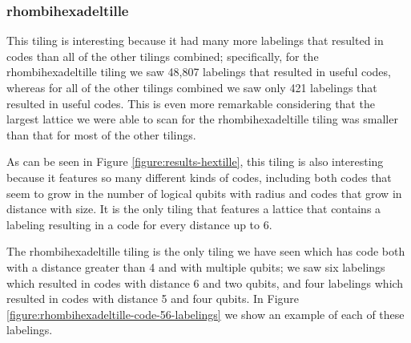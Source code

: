\documentclass[twocolumn,showpacs,preprintnumbers,amsmath,amssymb,nofootinbib,pra,floatfix]{revtex4-1}
\begin{document}
\subsubsection{rhombihexadeltille}

This tiling is interesting because it had many more labelings that resulted in codes  than all of the other tilings combined;  specifically, for the rhombihexadeltille tiling we saw 48,807 labelings that resulted in useful codes, whereas for all of the other tilings combined we saw only 421 labelings that resulted in useful codes.  This is even more remarkable considering that the largest lattice we were able to scan for the rhombihexadeltille tiling was smaller than that for most of the other tilings.

As can be seen in Figure \ref{figure:results-hextille}, this tiling is also interesting because it features so many different kinds of codes, including both codes that seem to grow in the number of logical qubits with radius and codes that grow in distance with size.  It is the only tiling that features a lattice that contains a labeling resulting in a code for every distance up to 6.

The rhombihexadeltille tiling is the only tiling we have seen which has code both with a distance greater than 4 and with multiple qubits;  we saw six labelings which resulted in codes with distance 6 and two qubits, and four labelings which resulted in codes with distance 5 and four qubits.  In Figure \ref{figure:rhombihexadeltille-code-56-labelings} we show an example of each of these labelings.
\end{document}
